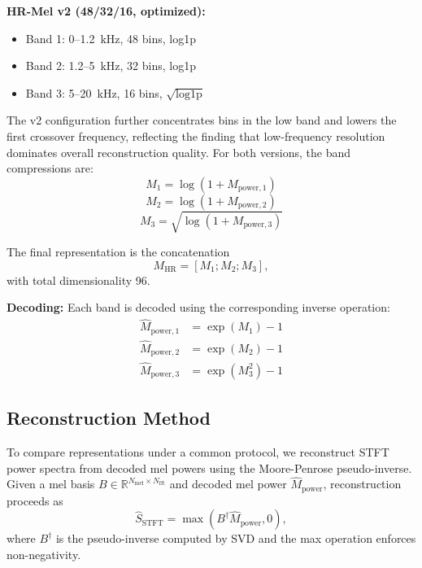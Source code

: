 \documentclass[twocolumn]{article}
\begin{document}
\textbf{HR-Mel v2 (48/32/16, optimized):}
\begin{itemize}
\item Band 1: 0--1.2~kHz, 48 bins, log1p
\item Band 2: 1.2--5~kHz, 32 bins, log1p
\item Band 3: 5--20~kHz, 16 bins, $\sqrt{\text{log1p}}$
\end{itemize}

The v2 configuration further concentrates bins in the low band and lowers the first crossover frequency, reflecting the finding that low-frequency resolution dominates overall reconstruction quality. For both versions, the band compressions are:
\begin{equation}
M_1 = \log(1 + M_{\text{power},1})
\end{equation}
\begin{equation}
M_2 = \log(1 + M_{\text{power},2})
\end{equation}
\begin{equation}
M_3 = \sqrt{\log(1 + M_{\text{power},3})}
\end{equation}

The final representation is the concatenation
\begin{equation}
M_{\text{HR}} = [M_1; M_2; M_3],
\end{equation}
with total dimensionality 96.

\textbf{Decoding:} Each band is decoded using the corresponding inverse operation:
\begin{align}
\hat{M}_{\text{power},1} &= \exp(M_1) - 1 \\
\hat{M}_{\text{power},2} &= \exp(M_2) - 1 \\
\hat{M}_{\text{power},3} &= \exp(M_3^2) - 1
\end{align}

\subsection{Reconstruction Method}

To compare representations under a common protocol, we reconstruct STFT power spectra from decoded mel powers using the Moore-Penrose pseudo-inverse. Given a mel basis $B \in \mathbb{R}^{N_{\text{mel}} \times N_{\text{fft}}}$ and decoded mel power $\hat{M}_{\text{power}}$, reconstruction proceeds as
\begin{equation}
\hat{S}_{\text{STFT}} = \max(B^{\dagger}\hat{M}_{\text{power}}, 0),
\end{equation}
where $B^{\dagger}$ is the pseudo-inverse computed by SVD and the max operation enforces non-negativity.
\end{document}
